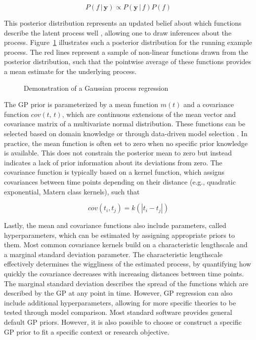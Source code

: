 \documentclass[man, floatsintext]{apa7}
\begin{document}
\begin{equation}
  P(f \, | \, \textbf{y})  \propto P(\textbf{y} \, | \, f) P(f)
\end{equation}

\noindent This posterior distribution represents an updated belief about which
functions describe the latent process well \parencite{kruschke_doing_2011},
allowing one to draw inferences about the process.
Figure~\ref{fig:gp_dem} illustrates such a posterior distribution for the
running example process. The red lines represent a sample of non-linear
functions drawn from the posterior distribution, such that the pointwise
average of these functions provides a mean estimate for the underlying process.

\begin{figure}[!t]
  \caption{Demonstration of a Gaussian process regression}
  \label{fig:gp_dem}
\end{figure}

The GP prior is parameterized by a mean function $m(t)$ and a covariance
function $cov(t, \, t)$, which are continuous extensions of the mean vector and
covariance matrix of a multivariate normal distribution. These functions can be
selected based on domain knowledge or through data-driven model selection
\parencite{richardson_gaussian_2017, abdessalem_automatic_2017}. In practice,
the mean function is often set to zero when no specific prior knowledge is
available. This does not constrain the posterior mean to zero but instead
indicates a lack of prior information about its deviations from zero. The
covariance function is typically based on a kernel function, which assigns
covariances between time points depending on their distance (e.g.,
quadratic exponential, Matern class kernels), such that

\begin{equation}
  cov(t_i, t_j) = k(|t_i - t_j|)
\end{equation}

Lastly, the mean and covariance functions also include parameters, called
hyperparameters, which can be estimated by assigning appropriate priors to
them. Most common covariance kernels build on a characteristic lengthscale and
a marginal standard deviation parameter. The characteristic lengthscale
effectively determines the wiggliness of the estimated process, by quantifying
how quickly the covariance decreases with increasing distances between time
points. The marginal standard deviation describes the spread of the functions
which are described by the GP at any point in time. However, GP regression can
also include additional hyperparameters, allowing for more specific theories to
be tested through model comparison. Most standard software provides general
default GP priors. However, it is also possible to choose or construct a
specific GP prior to fit a specific context or research objective.
\end{document}
